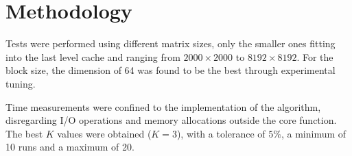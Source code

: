 \documentclass[../thesis]{subfiles}
\begin{document}
	\section{Methodology}
	\label{sec:multicore:method}

	Tests were performed using different matrix sizes, only the smaller ones fitting into the \cpu last level cache and ranging from $2000 \times 2000$ to $8192 \times 8192$. For the block size, the dimension of 64 was found to be the best through experimental tuning.

	Time measurements were confined to the implementation of the algorithm, disregarding I/O operations and memory allocations outside the core function. The best $K$ values were obtained ($K = 3$), with a tolerance of $5\%$, a minimum of 10 runs and a maximum of 20.
\end{document}
